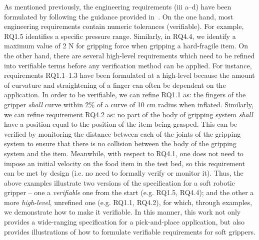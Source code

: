 \documentclass[letterpaper, 10 pt, conference]{ieeeconf}  %
\begin{document}
	As mentioned previously, the engineering requirements (iii a--d) have been formulated by following the guidance provided in~\cite{NASA2007}. 
	On the one hand, most engineering requirements contain numeric tolerances (verifiable). 
	For example, RQ1.5 identifies a specific pressure range. 
	Similarly, in RQ4.4, we identify a maximum value of 2 N for gripping force when gripping a hard-fragile item. 
	On the other hand, there are several high-level requirements which need to be refined into verifiable terms before any verification method can be applied.  
	For instance, requirements RQ1.1--1.3 have been formulated at a high-level because the amount of curvature and straightening of a finger can often be dependent on the application. 
	In order to be verifiable, we can refine RQ1.1 as: the fingers of the gripper \emph{shall} curve within 2\% of a curve of 10 cm radius when inflated. 
	Similarly, we can refine requirement RQ4.2 as: no part of the body of gripping system \emph{shall} have a position equal to the position of the item being grasped. 
	This can be verified by monitoring the distance between each of the joints of the gripping system to ensure that there is no collision between the body of the gripping system and the item. 
	Meanwhile, with respect to RQ4.1, one does not need to impose an initial velocity on the food item in the test bed, so this requirement can be met by design (i.e. no need to formally verify or monitor it). Thus, the above examples illustrate two versions of the specification for a soft robotic gripper -- one a \emph{verifiable} one from the start (e.g. RQ1.5, RQ4.4); and the other a more \emph{high-level}, unrefined one (e.g. RQ1.1, RQ4.2), for which, through examples, we demonstrate how to make it verifiable. In this manner, this work not only provides a wide-ranging specification for a pick-and-place application, but also provides illustrations of how to formulate verifiable requirements for soft grippers. 

 
\end{document}
